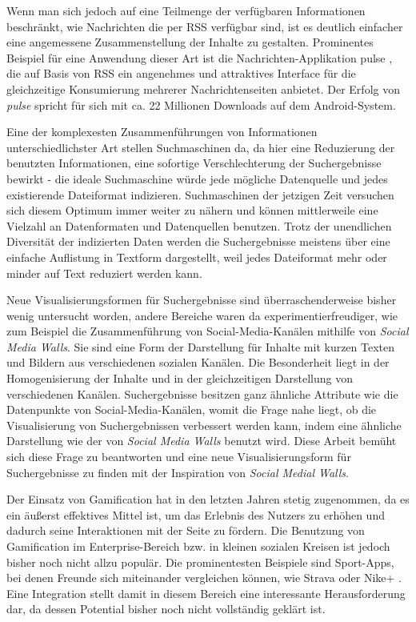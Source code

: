 \documentclass[12pt,twoside]{book}
\begin{document}
Wenn man sich jedoch auf eine Teilmenge der verfügbaren Informationen beschränkt, wie Nachrichten die per RSS verfügbar sind, ist es deutlich einfacher eine angemessene Zusammenstellung der Inhalte zu gestalten. Prominentes Beispiel für eine Anwendung dieser Art ist die Nachrichten-Applikation pulse \cite{pulse}, die auf Basis von RSS ein angenehmes und attraktives Interface für die gleichzeitige Konsumierung mehrerer Nachrichtenseiten anbietet. Der Erfolg von \textit{pulse} spricht für sich mit ca. 22 Millionen Downloads auf dem Android-System.

Eine der komplexesten Zusammenführungen von Informationen unterschiedlichster Art stellen Suchmaschinen da, da hier eine Reduzierung der benutzten Informationen, eine sofortige Verschlechterung der Suchergebnisse bewirkt - die ideale Suchmaschine würde jede mögliche Datenquelle und jedes existierende Dateiformat indizieren.
Suchmaschinen der jetzigen Zeit versuchen sich diesem Optimum immer weiter zu nähern und können mittlerweile eine Vielzahl an Datenformaten und Datenquellen benutzen.
Trotz der unendlichen Diversität der indizierten Daten werden die Suchergebnisse meistens über eine einfache Auflistung in Textform dargestellt, weil jedes Dateiformat mehr oder minder auf Text reduziert werden kann.

Neue Visualisierungsformen für Suchergebnisse sind überraschenderweise bisher wenig untersucht worden, andere Bereiche waren da experimentierfreudiger, wie zum Beispiel die Zusammenführung von Social-Media-Kanälen mithilfe von \textit{Social Media Walls}.
Sie sind eine Form der Darstellung für Inhalte mit kurzen Texten und Bildern aus verschiedenen sozialen Kanälen. Die Besonderheit liegt in der Homogenisierung der Inhalte und in der gleichzeitigen Darstellung von verschiedenen Kanälen.
Suchergebnisse besitzen ganz ähnliche Attribute wie die Datenpunkte von Social-Media-Kanälen, womit die Frage nahe liegt, ob die Visualisierung von Suchergebnissen verbessert werden kann, indem eine ähnliche Darstellung wie der von \textit{Social Media Walls} benutzt wird.
Diese Arbeit bemüht sich diese Frage zu beantworten und eine neue Visualisierungsform für Suchergebnisse zu finden mit der Inspiration von \textit{Social Medial Walls}.

Der Einsatz von Gamification hat in den letzten Jahren stetig zugenommen, da es ein äußerst effektives Mittel ist, um das Erlebnis des Nutzers zu erhöhen und dadurch seine Interaktionen mit der Seite zu fördern.
Die Benutzung von Gamification im Enterprise-Bereich bzw. in kleinen sozialen Kreisen ist jedoch bisher noch nicht allzu populär. Die prominentesten Beispiele sind Sport-Apps, bei denen Freunde sich miteinander vergleichen können, wie Strava \cite{strava} oder Nike+ \cite{nike}. Eine Integration stellt damit in diesem Bereich eine interessante Herausforderung dar, da dessen Potential bisher noch nicht vollständig geklärt ist.
\end{document}
